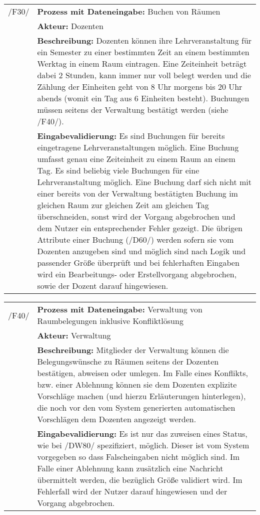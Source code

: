 \begin{tabular}{p{1.5cm}p{14.5cm}}
		
	 /F30/	& \textbf{Prozess mit Dateneingabe:} Buchen von Räumen \\
				& \textbf{Akteur:} Dozenten \\
				& \textbf{Beschreibung:} Dozenten können ihre Lehrveranstaltung für ein Semester zu einer bestimmten Zeit an einem bestimmten Werktag in einem Raum eintragen. Eine Zeiteinheit beträgt dabei 2 Stunden, kann immer nur voll belegt werden und die Zählung der Einheiten geht von 8 Uhr morgens bis 20 Uhr abends (womit ein Tag aus 6 Einheiten besteht). Buchungen müssen seitens der Verwaltung bestätigt werden (siehe /F40/). \\
				& \textbf{Eingabevalidierung:} Es sind Buchungen für bereits eingetragene Lehrveranstaltungen möglich. Eine Buchung umfasst genau eine Zeiteinheit zu einem Raum an einem Tag. Es sind beliebig viele Buchungen für eine Lehrveranstaltung möglich. Eine Buchung darf sich nicht mit einer bereits von der Verwaltung bestätigten Buchung im gleichen Raum zur gleichen Zeit am gleichen Tag überschneiden, sonst wird der Vorgang abgebrochen und dem Nutzer ein entsprechender Fehler gezeigt. Die übrigen Attribute einer Buchung (/D60/) werden sofern sie vom Dozenten anzugeben sind und möglich sind nach Logik und passender Größe überprüft und bei fehlerhaften Eingaben wird ein Bearbeitungs- oder Erstellvorgang abgebrochen, sowie der Dozent darauf hingewiesen.\\[0.25cm]

\end{tabular}


\begin{tabular}{p{1.5cm}p{14.5cm}}
		
	 /F40/ & \textbf{Prozess mit Dateneingabe:} Verwaltung von Raumbelegungen inklusive Konfliktlösung \\
				& \textbf{Akteur:} Verwaltung \\
				& \textbf{Beschreibung:} Mitglieder der Verwaltung können die Belegungswünsche zu Räumen seitens der Dozenten bestätigen, abweisen oder umlegen. Im Falle eines Konflikts, bzw. einer Ablehnung können sie dem Dozenten explizite Vorschläge machen (und hierzu Erläuterungen hinterlegen), die noch vor den vom System generierten automatischen Vorschlägen dem Dozenten angezeigt werden. \\
				& \textbf{Eingabevalidierung:} Es ist nur das zuweisen eines Status, wie bei /DW80/ spezifiziert, möglich. Dieser ist vom System vorgegeben so dass Falscheingaben nicht möglich sind. Im Falle einer Ablehnung kann zusätzlich eine Nachricht übermittelt werden, die bezüglich Größe validiert wird. Im Fehlerfall wird der Nutzer darauf hingewiesen und der Vorgang abgebrochen.\\[0.25cm]

\end{tabular}


